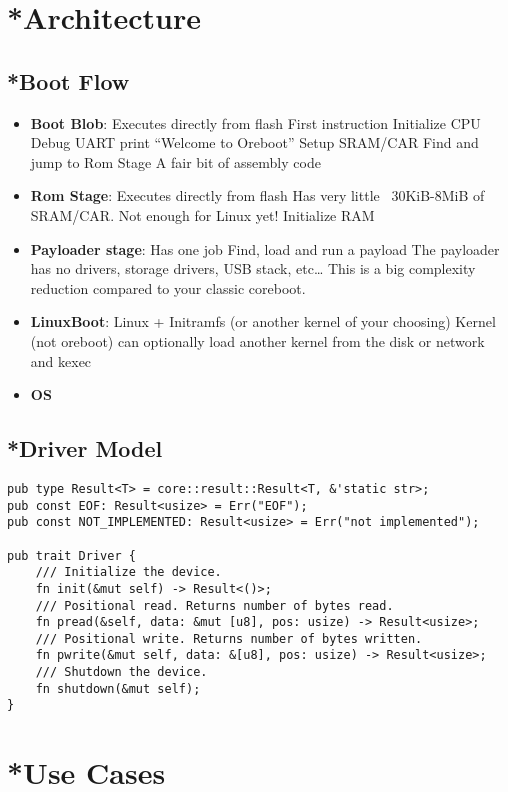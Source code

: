 \documentclass[conference]{IEEEtran}
\begin{document}
\section{*Architecture}

\subsection{*Boot Flow}

\begin{itemize}
    \item \textbf{Boot Blob}: Executes directly from flash
First instruction
Initialize CPU
Debug UART print “Welcome to Oreboot”
Setup SRAM/CAR
Find and jump to Rom Stage
A fair bit of assembly code
    \item \textbf{Rom Stage}: Executes directly from flash
Has very little ~30KiB-8MiB of SRAM/CAR. Not enough for Linux yet!
Initialize RAM
    \item \textbf{Payloader stage}: Has one job
Find, load and run a payload
The payloader has no drivers, storage drivers, USB stack, etc… This is a big complexity reduction compared to your classic coreboot.
    \item \textbf{LinuxBoot}: Linux + Initramfs (or another kernel of your choosing)
Kernel (not oreboot) can optionally load another kernel from the disk or network and kexec
    \item \textbf{OS}
\end{itemize}

\subsection{*Driver Model}

\begin{verbatim}
pub type Result<T> = core::result::Result<T, &'static str>;
pub const EOF: Result<usize> = Err("EOF");
pub const NOT_IMPLEMENTED: Result<usize> = Err("not implemented");

pub trait Driver {
	/// Initialize the device.
	fn init(&mut self) -> Result<()>;
	/// Positional read. Returns number of bytes read.
	fn pread(&self, data: &mut [u8], pos: usize) -> Result<usize>;
	/// Positional write. Returns number of bytes written.
	fn pwrite(&mut self, data: &[u8], pos: usize) -> Result<usize>;
	/// Shutdown the device.
	fn shutdown(&mut self);
}
\end{verbatim}

\section{*Use Cases}
\end{document}

